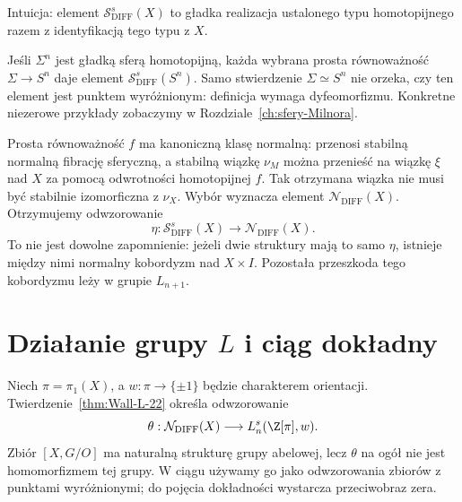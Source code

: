 Intuicja: element $\mathcal S^s_{\mathrm{DIFF}}(X)$
to gładka realizacja ustalonego typu homotopijnego
razem z identyfikacją tego typu z $X$.

\begin{przyklad}
\label{prz:struktury-sfera-23}
Jeśli $\Sigma^n$ jest gładką sferą homotopijną,
każda wybrana prosta równoważność
$\Sigma\to S^n$ daje element
$\mathcal S^s_{\mathrm{DIFF}}(S^n)$.
Samo stwierdzenie $\Sigma\simeq S^n$
nie orzeka, czy ten element jest punktem
wyróżnionym: definicja wymaga dyfeomorfizmu.
Konkretne niezerowe przykłady zobaczymy
w Rozdziale~\ref{ch:sfery-Milnora}.
\end{przyklad}

Prosta równoważność $f$ ma kanoniczną klasę
normalną: przenosi stabilną normalną
fibrację sferyczną, a stabilną wiązkę
$\nu_M$ można przenieść na wiązkę $\xi$
nad $X$ za pomocą odwrotności homotopijnej $f$.
Tak otrzymana wiązka nie musi być
stabilnie izomorficzna z $\nu_X$.
Wybór wyznacza element $\mathcal N_{\mathrm{DIFF}}(X)$.
Otrzymujemy odwzorowanie
\[
 \eta:\mathcal S^s_{\mathrm{DIFF}}(X)
          \longrightarrow\mathcal N_{\mathrm{DIFF}}(X).
\]
To nie jest dowolne zapomnienie:
jeżeli dwie struktury mają to samo $\eta$,
istnieje między nimi normalny kobordyzm
nad $X\times I$. Pozostała przeszkoda
tego kobordyzmu leży w grupie $L_{n+1}$.

\section{Działanie grupy \texorpdfstring{$L$}{L} i ciąg dokładny}
\label{sec:exact-surgery-23}

Niech $\pi=\pi_1(X)$, a
$w:\pi\to\{\pm1\}$ będzie charakterem
orientacji. Twierdzenie~\ref{thm:Wall-L-22}
określa odwzorowanie
\[
 \theta:\mathcal N_{\mathrm{DIFF}}(X)
       \longrightarrow L_n^s(\Z[\pi],w).
\]
Zbiór $[X,G/O]$ ma naturalną strukturę grupy
abelowej, lecz $\theta$ na ogół nie jest
homomorfizmem tej grupy. W ciągu używamy go
jako odwzorowania zbiorów z punktami wyróżnionymi;
do pojęcia dokładności wystarcza przeciwobraz zera.

